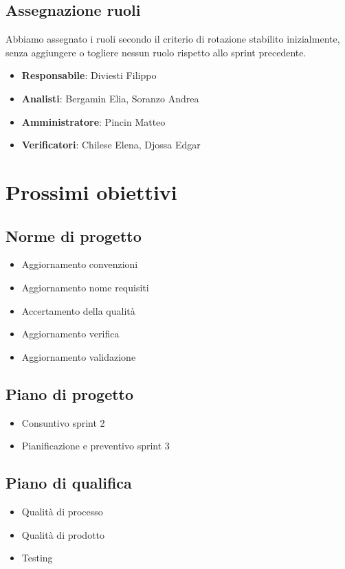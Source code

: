    \subsection{Assegnazione ruoli}
        Abbiamo assegnato i ruoli secondo il criterio di rotazione stabilito inizialmente,
        senza aggiungere o togliere nessun ruolo rispetto allo sprint precedente.
        \begin{itemize}
            \item \textbf{Responsabile}: Diviesti Filippo
            \item \textbf{Analisti}: Bergamin Elia, Soranzo Andrea
            \item \textbf{Amministratore}: Pincin Matteo
            \item \textbf{Verificatori}: Chilese Elena, Djossa Edgar
        \end{itemize}
    

\section{Prossimi obiettivi}
        \subsection{Norme di progetto}
            \begin{itemize}
                \item Aggiornamento convenzioni
                \item Aggiornamento nome requisiti
                \item Accertamento della qualità
                \item Aggiornamento verifica 
                \item Aggiornamento validazione
            \end{itemize}
        \subsection{Piano di progetto}
            \begin{itemize}
                \item Consuntivo sprint 2
                \item Pianificazione e preventivo sprint 3
            \end{itemize}
        \subsection{Piano di qualifica}
            \begin{itemize}
                \item Qualità di processo
                \item Qualità di prodotto
                \item Testing
            \end{itemize}
